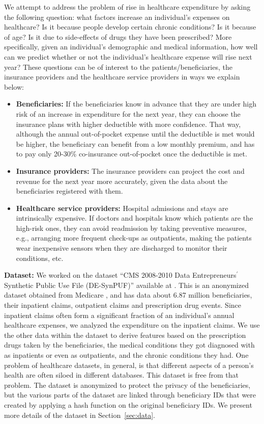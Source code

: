 We attempt to address the problem of rise in healthcare expenditure by asking the following question: what factors increase an individual's expenses on healthcare? Is it because people develop certain chronic conditions? Is it because of age? Is it due to side-effects of drugs they have been prescribed? More specifically, given an individual's demographic and medical information, how well can we predict whether or not the individual's healthcare expense will rise next year? These questions can be of interest to the patients/beneficiaries, the insurance providers and the healthcare service providers in ways we explain below:
\begin{itemize}
\item {\bf Beneficiaries:} If the beneficiaries know in advance that they are under high risk of an increase in expenditure for the next year, they can choose the insurance plans with higher deductible with more confidence. That way, although the annual out-of-pocket expense until the deductible is met would be higher, the beneficiary can benefit from a low monthly premium, and has to pay only 20-30\% co-insurance out-of-pocket once the deductible is met. 
\item {\bf Insurance providers:} The insurance providers can project the cost and revenue for the next year more accurately, given the data about the beneficiaries registered with them.
\item {\bf Healthcare service providers:} Hospital admissions and stays are intrinsically expensive. If doctors and hospitals know which patients are the high-risk ones, they can avoid readmission by taking preventive measures, e.g., arranging more frequent check-ups as outpatients, making the patients wear inexpensive sensors when they are discharged to monitor their conditions, etc.
\end{itemize}

{\bf Dataset: } We worked on the dataset ``CMS 2008-2010 Data Entrepreneurs$^\prime$ Synthetic Public Use File (DE-SynPUF)'' available at \cite{desynpuf}. This is an anonymized dataset obtained from Medicare \cite{medicare}, and has data about 6.87 million beneficiaries, their inpatient claims, outpatient claims and prescription drug events. Since inpatient claims often form a significant fraction of an individual's annual healthcare expenses, we analyzed the expenditure on the inpatient claims. We use the other data within the dataset to derive features based on the prescription drugs taken by the beneficiaries, the medical conditions they got diagnosed with as inpatients or even as outpatients, and the chronic conditions they had. One problem of healthcare datasets, in general, is that different aspects of a person's health are often siloed in different databases. This dataset is free from that problem. The dataset is anonymized to protect the privacy of the beneficiaries, but the various parts of the dataset are linked through beneficiary IDs that were created by applying a hash function on the original beneficiary IDs. We present more details of the dataset in Section~\ref{sec:data}.\\

